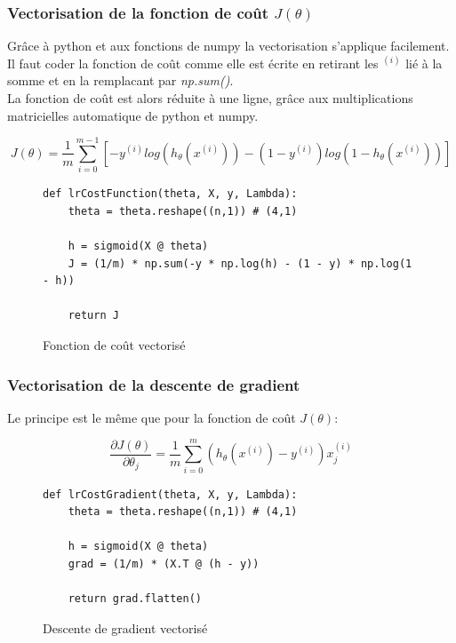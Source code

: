 \subsubsection{Vectorisation de la fonction de coût $J(\theta)$}

Grâce à python et aux fonctions de numpy la vectorisation s'applique facilement. Il faut coder la fonction de coût comme elle est écrite en retirant les $^{(i)}$ lié à la somme et en la remplacant par \textit{np.sum()}. \\
La fonction de coût est alors réduite à une ligne, grâce aux multiplications matricielles automatique de python et numpy.

\begin{equation}\label{eq:cout}
    J(\theta) = \frac{1}{m} \sum_{i=0}^{m-1}[-y^{(i)} log(h_\theta(x^{(i)})) - (1-y^{(i)}) log(1-h_\theta(x^{(i)}))]
\end{equation}

\begin{figure}[!h]
\begin{verbatim}
def lrCostFunction(theta, X, y, Lambda):
    theta = theta.reshape((n,1)) # (4,1)
 
    h = sigmoid(X @ theta)
    J = (1/m) * np.sum(-y * np.log(h) - (1 - y) * np.log(1 - h))
      
    return J
\end{verbatim}   
\caption{Fonction de coût vectorisé}
\end{figure}

\subsubsection{Vectorisation de la descente de gradient}
\noindent
Le principe est le même que pour la fonction de coût $J(\theta)$:

\begin{equation}\label{eq:descente-gradient}
    \frac{\partial J(\theta)}{\partial \theta_j} = \frac{1}{m} \sum_{i=0}^{m} (h_\theta(x^{(i)}) - y^{(i)}) x_j^{(i)}
\end{equation}

\begin{figure}[!h]
\begin{verbatim}
def lrCostGradient(theta, X, y, Lambda):
    theta = theta.reshape((n,1)) # (4,1)

    h = sigmoid(X @ theta)
    grad = (1/m) * (X.T @ (h - y))

    return grad.flatten()
\end{verbatim}   
\caption{Descente de gradient vectorisé}
\end{figure}


